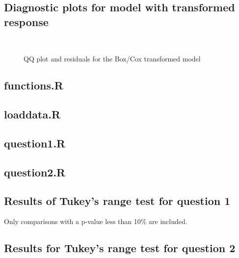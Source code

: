 \subsection{Diagnostic plots for model with transformed response}\label{app:transformations-model1}
\begin{figure}[ht]
    \centering
    \mbox{   \quad 
            }
    \caption{QQ plot and residuals for the Box/Cox transformed model}
    \label{fig:qq-and-residuals-log-sqrt}
\end{figure}
\subsection{functions.R}

\subsection{loaddata.R}

\subsection{question1.R}

\subsection{question2.R}

\subsection{Results of Tukey's range test for question 1}\label{app:q1-tukey}
Only comparisons with a p-value less than 10\% are included.

\subsection{Results for Tukey's range test for question 2}\label{app:q2-tukey}


\pagebreak



